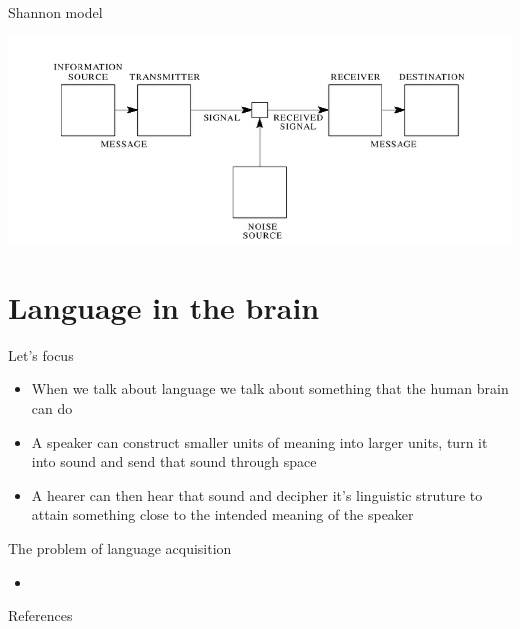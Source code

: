 \documentclass{beamer}
\begin{document}
\begin{frame}{Shannon model}
	
	\includegraphics[scale=0.4]{shannon.png}
	\nocite{shannon1948mathematical}
\end{frame}




\section{Language in the brain}

\begin{frame}{Let's focus}
	\begin{itemize}
		\item When we talk about language we talk about something that the human brain can do
		\item A speaker can construct smaller units of meaning into larger units, turn it into sound and send that sound through space
		\item A hearer can then hear that sound and decipher it's linguistic struture to attain something close to the intended meaning of the speaker

	\end{itemize}

\end{frame}


\begin{frame}{The problem of language acquisition}
	\begin{itemize}
	\item 
	\end{itemize}

\end{frame}



\begin{frame}{References}
	
	

\end{frame}
\end{document}
